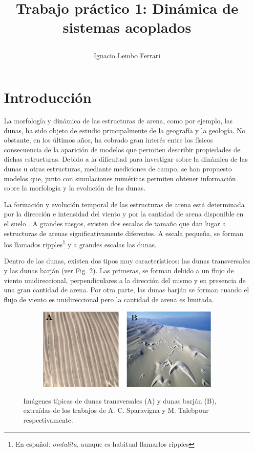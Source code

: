 \documentclass[11pt,twocolumn,twoside]{opticajnl}
\title{

\vspace{-0.2cm} 

Trabajo práctico 1: Dinámica de sistemas acoplados}
\author[1]{Ignacio Lembo Ferrari}
\affil[1]{Instituto Balseiro - ignacio.lembo@ib.edu.ar 

\vspace{0.1cm}

13 de septiembre de 2023.}
\begin{document}
\maketitle

\section{Introducción \label{sec:intro}}

La morfología y dinámica de las estructuras de arena, como por ejemplo, las dunas, ha sido objeto de estudio principalmente de la geografía y la geología. No obstante, en los últimos años, ha cobrado gran interés entre los físicos consecuencia de la aparición de modelos que permiten describir propiedades de dichas estructuras. Debido a la dificultad para investigar sobre la dinámica de las dunas u otras estructuras, mediante mediciones de campo, se han propuesto modelos \cite{nishimori_formation_1993} \cite{katsuki_cellular_2011} que, junto con simulaciones numéricas permiten obtener información sobre la morfología y la evolución de las dunas.

La formación y evolución temporal de las estructuras de arena está determinada por la dirección e intensidad del viento y por la cantidad de arena disponible en el suelo \cite{bullard_wasson_2010}. A grandes rasgos, existen dos escalas de tamaño que dan lugar a estructuras de arenas significativamente diferentes. A escala pequeña, se forman los llamados ripples\footnote{En español: \textit{ondulita}, aunque es habitual llamarlos ripples} y a grandes escalas las dunas. 

Dentro de las dunas, existen dos tipos muy característicos: las dunas transversales y las dunas barján (ver Fig. \ref{fig:ej}). Las primeras, se forman debido a un flujo de viento unidireccional, perpendiculares a la dirección del mismo y en presencia de una gran cantidad de arena. Por otra parte, las dunas barján se forman cuando el flujo de viento es unidireccional pero la cantidad de arena es limitada.

\begin{figure}[H]
\centering
     \begin{subfigure}[b]{\linewidth}
        \includegraphics[width=\textwidth]{Figuras/dunas.eps}
         \label{fig:dunas}
     \end{subfigure}
\caption{\centering Imágenes típicas de dunas transversales (A) y dunas barján (B), extraídas de los trabajos de A. C. Sparavigna \cite{sparavigna_peruvian_nodate} y M. Talebpour \cite{mahdad_talebpour_numerical_2016} respectivamente.} 
\label{fig:ej}
\end{figure}
\end{document}
